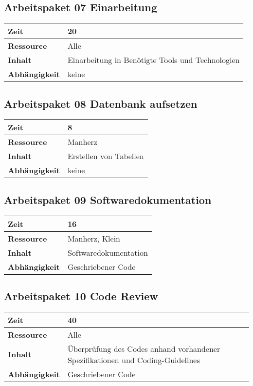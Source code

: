 \documentclass[12pt,a4paper,onecolumn]{article}
\begin{document}
\subsection{Arbeitspaket 07 Einarbeitung}
\begin{tabularx}{\textwidth}{|l|X|}
\hline
     \textbf{Zeit} & 20 \\
     \hline
     \textbf{Ressource} & Alle\\
     \hline
     \textbf{Inhalt} & Einarbeitung in Benötigte Tools und Technologien \\
     \hline
     \textbf{Abhängigkeit} & keine \\
\hline
\end{tabularx}

\subsection{Arbeitspaket 08 Datenbank aufsetzen}
\begin{tabularx}{\textwidth}{|l|X|}
\hline
     \textbf{Zeit} & 8 \\
     \hline
     \textbf{Ressource} & Manherz\\
     \hline
     \textbf{Inhalt} &  Erstellen von Tabellen\\
     \hline
     \textbf{Abhängigkeit} & keine\\
\hline
\end{tabularx}

\subsection{Arbeitspaket 09 Softwaredokumentation}
\begin{tabularx}{\textwidth}{|l|X|}
\hline
     \textbf{Zeit} &  16\\
     \hline
     \textbf{Ressource} & Manherz, Klein\\
     \hline
     \textbf{Inhalt} &  Softwaredokumentation\\
     \hline
     \textbf{Abhängigkeit} & Geschriebener Code\\
\hline
\end{tabularx}

\subsection{Arbeitspaket 10 Code Review}
\begin{tabularx}{\textwidth}{|l|X|}
\hline
     \textbf{Zeit} & 40\\
     \hline
     \textbf{Ressource} & Alle\\
     \hline
     \textbf{Inhalt} &  Überprüfung des Codes anhand vorhandener Spezifikationen und Coding-Guidelines\\
     \hline
     \textbf{Abhängigkeit} & Geschriebener Code\\
\hline
\end{tabularx}
\end{document}
